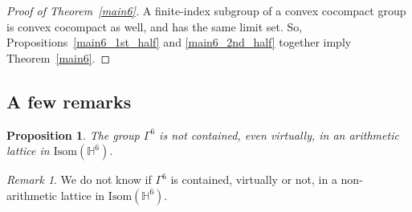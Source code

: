 \documentclass{amsart}
\theoremstyle{plain}
\newtheorem{proposition}[theorem]{Proposition}
\theoremstyle{definition}
\theoremstyle{remark}
\newtheorem{remark}[theorem]{Remark}
\numberwithin{equation}{section}
\newcommand{\hh}{\mathbb H}
\begin{document}
\begin{proof}[Proof of Theorem~\ref{main6}]
A finite-index subgroup of a convex cocompact group is convex cocompact as well, and has the same limit set.
So, Propositions~\ref{main6_1st_half} and \ref{main6_2nd_half}   together imply Theorem~\ref{main6}.
\end{proof}

\subsection{A few remarks}\label{sec:few_remarks}

\begin{proposition}
    The group $\Gamma^6$ is not contained, even virtually, in an arithmetic lattice in $\mathrm{Isom}(\hh^6)$.
\end{proposition}

\begin{remark}
    We do not know if $\Gamma^6$ is contained, virtually or not, in a non-arithmetic lattice in $\mathrm{Isom}(\hh^6)$.
\end{remark}
\end{document}
